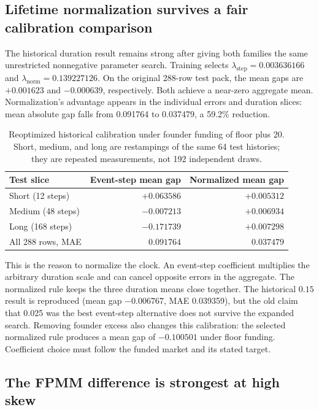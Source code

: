 \documentclass[10pt]{article}
\begin{document}
\subsection{Lifetime normalization survives a fair calibration comparison}

The historical duration result remains strong after giving both families the same unrestricted nonnegative parameter search. Training selects $\lambda_{\mathrm{step}}=0.003636166$ and $\lambda_{\mathrm{norm}}=0.139227126$. On the original 288-row test pack, the mean gaps are $+0.001623$ and $-0.000639$, respectively. Both achieve a near-zero aggregate mean. Normalization's advantage appears in the individual errors and duration slices: mean absolute gap falls from 0.091764 to 0.037479, a 59.2\% reduction.

\begin{table}[t]
\centering
\caption{Reoptimized historical calibration under founder funding of floor plus 20. Short, medium, and long are restampings of the same 64 test histories; they are repeated measurements, not 192 independent draws.}
\label{tab:duration}
\begin{tabular}{lrr}
\toprule
Test slice & Event-step mean gap & Normalized mean gap \\
\midrule
Short (12 steps) & $+0.063586$ & $+0.005312$ \\
Medium (48 steps) & $-0.007213$ & $+0.006934$ \\
Long (168 steps) & $-0.171739$ & $+0.007298$ \\
All 288 rows, MAE & $0.091764$ & $0.037479$ \\
\bottomrule
\end{tabular}
\end{table}

This is the reason to normalize the clock. An event-step coefficient multiplies the arbitrary duration scale and can cancel opposite errors in the aggregate. The normalized rule keeps the three duration means close together. The historical $0.15$ result is reproduced (mean gap $-0.006767$, MAE 0.039359), but the old claim that 0.025 was the best event-step alternative does not survive the expanded search. Removing founder excess also changes this calibration: the selected normalized rule produces a mean gap of $-0.100501$ under floor funding. Coefficient choice must follow the funded market and its stated target.

\subsection{The FPMM difference is strongest at high skew}
\end{document}
